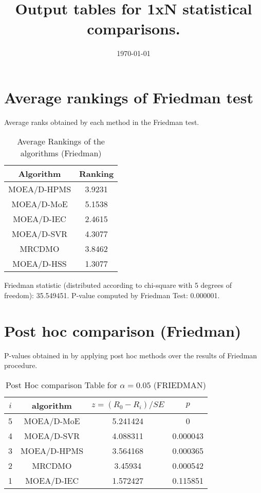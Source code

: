 \documentclass[a4paper,10pt]{article}
\title{Output tables for 1xN statistical comparisons.}
\author{}
\date{\today}
\begin{document}
\begin{landscape}
\pagestyle{empty}
\maketitle
\thispagestyle{empty}

\section{Average rankings of Friedman test}


Average ranks obtained by each method in the Friedman test.

\begin{table}[!htp]
\centering
\begin{tabular}{|c|c|}\hline
Algorithm&Ranking\\\hline
MOEA/D-HPMS&3.9231\\ 
MOEA/D-MoE&5.1538\\
 MOEA/D-IEC&2.4615\\
 MOEA/D-SVR&4.3077\\ 
 MRCDMO&3.8462\\
 MOEA/D-HSS&1.3077\\
 \hline\end{tabular}
\caption{Average Rankings of the algorithms (Friedman)}
\end{table}

Friedman statistic (distributed according to chi-square with 5 degrees of freedom): 35.549451. \newline P-value computed by Friedman Test: 0.000001.\newline


\newpage

\section{Post hoc comparison (Friedman)}


P-values obtained in by applying post hoc methods over the results of Friedman procedure.

\begin{table}[!htp]
\centering\footnotesize
\begin{tabular}{cccc}
$i$&algorithm&$z=(R_0 - R_i)/SE$&$p$\\
\hline5& MOEA/D-MoE&5.241424&0\\4& MOEA/D-SVR&4.088311&0.000043\\3&MOEA/D-HPMS&3.564168&0.000365\\2& MRCDMO&3.45934&0.000542\\1& MOEA/D-IEC&1.572427&0.115851\\\hline
\end{tabular}
\caption{Post Hoc comparison Table for $\alpha=0.05$ (FRIEDMAN)}
\end{table}
\newpage


\end{landscape}
\end{document}
